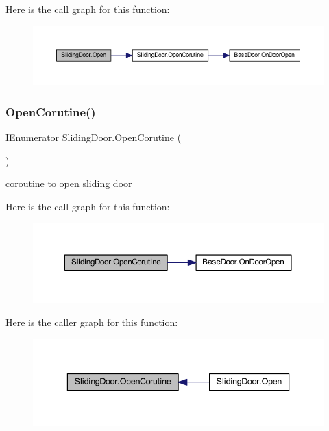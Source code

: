Here is the call graph for this function\+:\nopagebreak
\begin{figure}[H]
\begin{center}
\leavevmode
\includegraphics[width=350pt]{class_sliding_door_aaf090e96cc143eb5ed3eaf875045efc9_cgraph}
\end{center}
\end{figure}
\mbox{\label{class_sliding_door_adb583a66e0b4eeb5e03e50a3d4d4e109}} 
\subsubsection{\texorpdfstring{Open\+Corutine()}{OpenCorutine()}}
{\footnotesize\ttfamily I\+Enumerator Sliding\+Door.\+Open\+Corutine (\begin{DoxyParamCaption}{ }\end{DoxyParamCaption})\hspace{0.3cm}{\ttfamily [private]}}



coroutine to open sliding door 

Here is the call graph for this function\+:\nopagebreak
\begin{figure}[H]
\begin{center}
\leavevmode
\includegraphics[width=350pt]{class_sliding_door_adb583a66e0b4eeb5e03e50a3d4d4e109_cgraph}
\end{center}
\end{figure}
Here is the caller graph for this function\+:\nopagebreak
\begin{figure}[H]
\begin{center}
\leavevmode
\includegraphics[width=336pt]{class_sliding_door_adb583a66e0b4eeb5e03e50a3d4d4e109_icgraph}
\end{center}
\end{figure}
\mbox{\label{class_sliding_door_a259817872880d475d54ba9721a6db5cc}} 
